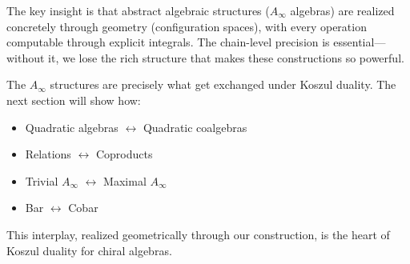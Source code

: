 The key insight is that abstract algebraic structures ($A_\infty$ algebras) are realized concretely through geometry (configuration spaces), with every operation computable through explicit integrals. The chain-level precision is essential—without it, we lose the rich structure that makes these constructions so powerful.

\begin{remark}
The $A_\infty$ structures are precisely what get exchanged under Koszul duality. The next section will show how:
\begin{itemize}
\item Quadratic algebras $\leftrightarrow$ Quadratic coalgebras
\item Relations $\leftrightarrow$ Coproducts
\item Trivial $A_\infty$ $\leftrightarrow$ Maximal $A_\infty$
\item Bar $\leftrightarrow$ Cobar
\end{itemize}
This interplay, realized geometrically through our construction, is the heart of Koszul duality for chiral algebras.
\end{remark}